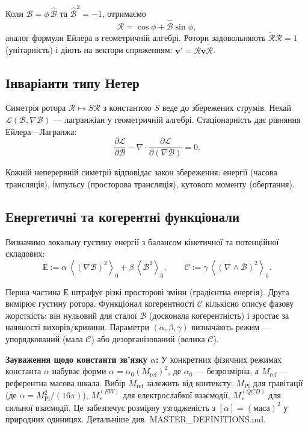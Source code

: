 \documentclass[11pt,a4paper]{article}
\newcommand{\grade}[2]{\left\langle #1 \right\rangle_{#2}}
\newcommand{\scal}[1]{\grade{#1}{0}}
\newcommand{\rev}[1]{\widetilde{#1}}           %
\newcommand{\Rotor}{\mathcal{R}}
\newcommand{\Biv}{\mathcal{B}}
\newcommand{\D}{\nabla}                        %
\theoremstyle{definition}
\theoremstyle{plain}
\theoremstyle{remark}
\begin{document}
Коли $\Biv = \phi\,\hat{\Biv}$ та $\hat{\Biv}^2 = -1$, отримаємо
\begin{equation}
\Rotor = \cos\phi + \hat{\Biv}\sin\phi,
\end{equation}
аналог формули Ейлера в геометричній алгебрі. Ротори задовольняють $\rev{\Rotor}\Rotor = 1$ (унітарність) і діють на вектори спряженням: $\mathbf{v}' = \Rotor \mathbf{v} \rev{\Rotor}$.

\subsection{Інваріанти типу Нетер}

Симетрія ротора $\Rotor\mapsto S\Rotor$ з константою $S$ веде до збережених струмів. Нехай $\mathcal{L}(\Biv,\D\Biv)$ — лагранжіан у геометричній алгебрі. Стаціонарність дає рівняння Ейлера—Лагранжа:
\begin{equation}
\frac{\partial \mathcal{L}}{\partial \Biv} - \D \cdot \frac{\partial \mathcal{L}}{\partial (\D\Biv)} = 0.
\end{equation}

Кожній неперервній симетрії відповідає закон збереження: енергії (часова трансляція), імпульсу (просторова трансляція), кутового моменту (обертання).

\subsection{Енергетичні та когерентні функціонали}

Визначимо локальну густину енергії з балансом кінетичної та потенційної складових:
\begin{equation}
  \mathcal{Е} := \alpha\, \scal{(\D \Biv)^2} + \beta\, \scal{\Biv^2},
  \qquad
  \mathcal{C} := \gamma\, \scal{(\D\wedge\Biv)^2}.
\end{equation}

Перша частина $\mathcal{Е}$ штрафує різкі просторові зміни (градієнтна енергія). Друга вимірює густину ротора. Функціонал когерентності $\mathcal{C}$ кількісно описує фазову жорсткість: він нульовий для сталої $\Biv$ (досконала когерентність) і зростає за наявності вихорів/кривини. Параметри $(\alpha,\beta,\gamma)$ визначають режим — упорядкований (мала $\mathcal{C}$) або дезорганізований (велика $\mathcal{C}$).

\textbf{Зауваження щодо константи зв'язку $\alpha$:} У конкретних фізичних режимах константа $\alpha$ набуває форми $\alpha = \alpha_0 (M_{\text{ref}})^2$, де $\alpha_0$ — безрозмірна, а $M_{\text{ref}}$ — референтна масова шкала. Вибір $M_{\text{ref}}$ залежить від контексту: $M_{\text{Pl}}$ для гравітації (де $\alpha = M_{\text{Pl}}^2/(16\pi)$), $M_*^{(EW)}$ для електрослабкої взаємодії, $M_*^{(QCD)}$ для сильної взаємодії. Це забезпечує розмірну узгодженість з $[\alpha] = (\text{маса})^2$ у природних одиницях. Детальніше див. MASTER\_DEFINITIONS.md.
\end{document}
